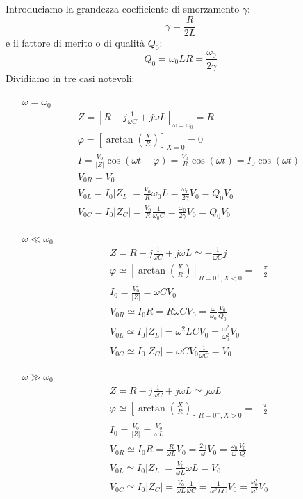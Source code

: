Introduciamo la grandezza coefficiente di smorzamento $\gamma$:
\begin{equation}
  \gamma = \frac{R}{2L}
\end{equation}
e il fattore di merito o di qualità $Q_0$:
\begin{equation}
  Q_0 = {\omega_0L}{R}=\frac{\omega_0}{2\gamma}
\end{equation}
Dividiamo in tre casi notevoli:
\begin{itemize}
  \item[$\omega=\omega_0$]
    \begin{gather}
      Z = \left[R-j\frac{1}{\omega C}+j\omega L\right]_{\omega=\omega_0}=R\\
      \varphi = \left[\arctan\left(\frac{X}{R}\right)\right]_{X=0}=0\\
      I = \frac{V_0}{|Z|}\cos\left(\omega t-\varphi\right)=\frac{V_0}{R}\cos(\omega t)=I_0\cos(\omega t)\\
      V_{0R}=V_0\\
      V_{0L}=I_0|Z_L|=\frac{V_0}{R}\omega_0 L=\frac{\omega_0}{2\gamma}V_0=Q_0V_0\\
      V_{0C}=I_0|Z_C|=\frac{V_0}{R}\frac{1}{\omega_0 C}=\frac{\omega_0}{2\gamma}V_0=Q_0V_0
    \end{gather}
  \item[$\omega\ll\omega_0$]
    \begin{gather}
      Z=R-j\frac{1}{\omega C}+j\omega L\simeq -\frac{1}{\omega C}j\\
      \varphi \simeq \left[\arctan\left(\frac{X}{R}\right)\right]_{R=0^+,X<0}=-\frac{\pi}{2}\\
      I_0 = \frac{V_0}{|Z|}=\omega C V_0\\
      V_{0R}\simeq I_0R=R\omega C V_0=\frac{\omega}{\omega_0}\frac{V_0}{Q_0}\\
      V_{0L}\simeq I_0|Z_L|=\omega^2LCV_0=\frac{\omega^2}{\omega_0^2}V_0\\
      V_{0C}\simeq I_0|Z_C|=\omega C V_0\frac{1}{\omega C}=V_0
    \end{gather}
  \item[$\omega\gg\omega_0$]
    \begin{gather}
      Z=R-j\frac{1}{\omega C}+j\omega L\simeq j\omega L\\
      \varphi \simeq \left[\arctan\left(\frac{X}{R}\right)\right]_{R=0^+,X>0}=+\frac{\pi}{2}\\
      I_0 = \frac{V_0}{|Z|}= \frac{V_0}{\omega L}\\
      V_{0R}\simeq I_0R=\frac{R}{\omega L}V_0=\frac{2\gamma}{\omega}V_0=\frac{\omega_0}{\omega}\frac{V_0}{Q}\\
      V_{0L}\simeq I_0|Z_L|=\frac{V_0}{\omega L}\omega L=V_0\\
      V_{0C}\simeq I_0|Z_C|=\frac{V_0}{\omega L}\frac{1}{\omega C}=\frac{1}{\omega^2 LC}V_0=\frac{\omega_0^2}{\omega^2}V_0
    \end{gather}
\end{itemize}
